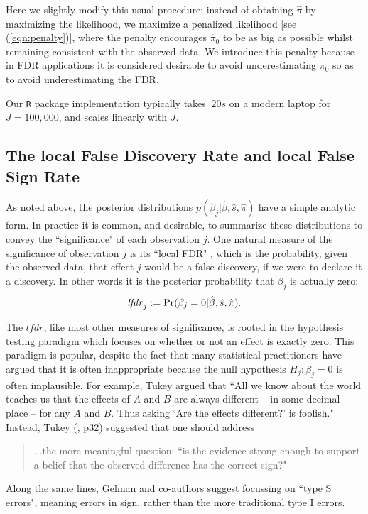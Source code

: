 \documentclass[11pt]{article}
\def\lfdr{\textit{lfdr}}
\def\bhat{\hat{\beta}}
\def\shat{\hat{s}}
\begin{document}
Here we slightly modify this usual procedure: instead of obtaining $\hat\pi$ by maximizing the likelihood, we maximize a penalized
likelihood [see (\ref{eqn:penalty})], where the penalty encourages $\hat\pi_0$ to be as big as possible whilst remaining consistent with the observed data. 
We introduce this penalty because in FDR applications it is considered desirable to avoid underestimating $\pi_0$ so as to avoid underestimating the FDR. 

Our {\tt R} package implementation typically takes $~20s$ on a modern laptop for $J=100,000$, and scales linearly with $J$. 


\subsection*{The local False Discovery Rate and local False Sign Rate}

As noted above, the posterior distributions $p(\beta_j | \bhat, \shat, \hat{\pi})$ have a simple analytic form.
In practice it is common, and desirable, to summarize these distributions to convey the ``significance" of each observation $j$.
One natural measure of the significance of observation $j$ is its ``local FDR" \cite{efron2008microarrays}, which is
the probability, given the observed data, that effect $j$ would be a false discovery, if we were to declare it a discovery.
In other words it is the posterior probability that $\beta_j$ is actually zero:
\begin{equation} \label{eqn:fdr}
\fdr_j := \Pr(\beta_j =0  |  \bhat, \shat, \hat{\pi}).
\end{equation}

The $\lfdr$, like most other measures of significance, is rooted in the hypothesis testing paradigm which focuses on 
whether or not an effect is exactly zero. This paradigm is popular, despite the fact that many statistical practitioners have argued that it is often inappropriate because
the null hypothesis $H_j: \beta_j=0$ is often implausible. For example, Tukey \cite{tukey1991philosophy} argued that
``All we know about the world teaches us that the effects of $A$ and $B$ are always different -- in some decimal place -- for any $A$ and $B$. Thus asking `Are the effects different?' is foolish." Instead, Tukey (\cite{tukey1962future}, p32) suggested  that one should address
\begin{quote}
...the more meaningful question: ``is the evidence strong enough to support a belief that the observed difference has the correct sign?"
\end{quote}
Along the same lines, Gelman and co-authors \cite{gelman2000type, gelman2012we} suggest  
focussing on ``type S errors", meaning errors in sign, rather than the more traditional type I errors.
\end{document}
